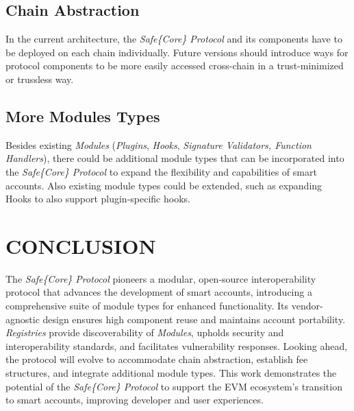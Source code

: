 \documentclass[
]{article}
\begin{document}
\hypertarget{chain-abstraction}{%
  \subsection{Chain Abstraction}\label{chain-abstraction}}

In the current architecture, the \emph{Safe\{Core\} Protocol} and its components have to be deployed on each chain individually. Future versions should introduce ways for protocol components to be more easily accessed cross-chain in a trust-minimized or trussless way.

\hypertarget{more-modules-types}{%
  \subsection{More Modules Types}\label{more-modules-types}}

Besides existing \emph{Modules} (\emph{Plugins}, \emph{Hooks}, \emph{Signature Validators, Function Handlers}), there could be additional module types that can be incorporated into the \emph{Safe\{Core\} Protocol} to expand the flexibility and capabilities of smart accounts. Also existing module types could be extended, such as expanding Hooks to also support plugin-specific hooks.

\hypertarget{conclusion}{%
  \section{CONCLUSION}\label{conclusion}}

The \emph{Safe\{Core\} Protocol} pioneers a modular, open-source interoperability protocol that advances the development of smart accounts, introducing a comprehensive suite of module types for enhanced functionality. Its vendor-agnostic design ensures high component reuse and maintains account portability. \emph{Registries} provide discoverability of \emph{Modules}, upholds security and interoperability standards, and facilitates vulnerability responses. Looking ahead, the protocol will evolve to accommodate chain abstraction, establish fee structures, and integrate additional module types. This work demonstrates the potential of the \emph{Safe\{Core\} Protocol} to support the EVM ecosystem's transition to smart accounts, improving developer and user experiences.

\hypertarget{section}{%
  \section{\texorpdfstring{\hfill\break}{ }}\label{section}}
\end{document}
